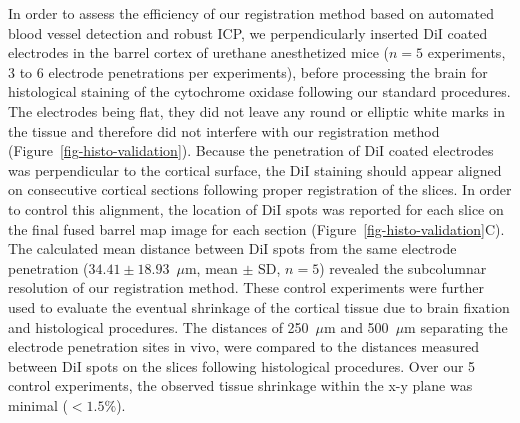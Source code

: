 In order to assess the efficiency of our registration method based on automated blood vessel detection and robust ICP, we perpendicularly inserted DiI coated electrodes in the barrel cortex of urethane anesthetized mice ($n=5$ experiments, 3 to 6 electrode penetrations per experiments), before processing the brain for histological staining of the cytochrome oxidase following our standard procedures. 
%
The electrodes being flat, they did not leave any round or elliptic white marks in the tissue and therefore did not interfere with our registration method (Figure~\ref{fig-histo-validation}).
%
Because the penetration of DiI coated electrodes was perpendicular to the cortical surface, the DiI staining  should appear aligned on consecutive cortical sections following proper registration of the slices. In order to control this alignment, the location of DiI spots was reported for each slice on the final fused barrel map image for each section (Figure~\ref{fig-histo-validation}C).  
%
The calculated mean distance between DiI spots from the same electrode penetration ($34.41\pm18.93$~$\mu$m, mean $\pm$ SD, $n=5$) revealed the subcolumnar resolution of our registration method. 
%
These control experiments were further used to evaluate the eventual shrinkage of the cortical tissue due to brain fixation and histological procedures. The distances of 250~$\mu$m and 500~$\mu$m separating the electrode penetration sites in vivo, were compared to the distances measured between DiI spots on the slices following histological procedures. Over our 5 control experiments, the observed tissue shrinkage within the x-y plane was minimal ($<1.5\%$).


